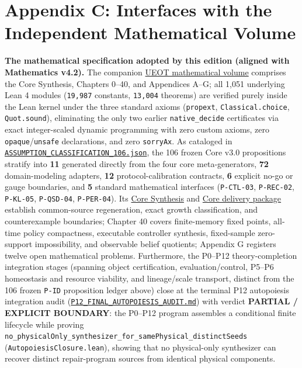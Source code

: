 \documentclass[
  english,
  11pt,
  oneside]{book}
\begin{document}
\chapter{Appendix C: Interfaces with the Independent Mathematical Volume}\label{ph-app-c}

\textbf{The mathematical specification adopted by this edition (aligned with Mathematics v4.2).} The companion \href{https://github.com/MurphyHoops/UEOT/blob/3d443ec29eb17af1fc00699a74e2d42d73516d81/mathematics/UEOT_MATHEMATICS.en.md}{UEOT mathematical volume} comprises the Core Synthesis, Chapters 0--40, and Appendices A--G; all 1,051 underlying Lean 4 modules (\texttt{19,987} constants, \texttt{13,004} theorems) are verified purely inside the Lean kernel under the three standard axioms (\texttt{propext}, \texttt{Classical.choice}, \texttt{Quot.sound}), eliminating the only two earlier \texttt{native\_decide} certificates via exact integer-scaled dynamic programming with zero custom axioms, zero \texttt{opaque}/\texttt{unsafe} declarations, and zero \texttt{sorryAx}. As cataloged in \href{https://github.com/MurphyHoops/UEOT/blob/3d443ec29eb17af1fc00699a74e2d42d73516d81/formalization/ueot-core/docs/ASSUMPTION_CLASSIFICATION_106.json}{\nolinkurl{ASSUMPTION_CLASSIFICATION_106.json}}, the 106 frozen Core v3.0 propositions stratify into \textbf{11} generated directly from the four core meta-generators, \textbf{72} domain-modeling adapters, \textbf{12} protocol-calibration contracts, \textbf{6} explicit no-go or gauge boundaries, and \textbf{5} standard mathematical interfaces (\texttt{P-CTL-03}, \texttt{P-REC-02}, \texttt{P-KL-05}, \texttt{P-QSD-04}, \texttt{P-PER-04}). Its \href{https://github.com/MurphyHoops/UEOT/blob/3d443ec29eb17af1fc00699a74e2d42d73516d81/mathematics/UEOT_MATHEMATICS.en.md\#core-theory}{Core Synthesis} and \href{https://github.com/MurphyHoops/UEOT/blob/3d443ec29eb17af1fc00699a74e2d42d73516d81/formalization/ueot-core/docs/compression/theory_completion/unified_closure/core_theory_closure_v1/README.md}{Core delivery package} establish common-source regeneration, exact growth classification, and counterexample boundaries; Chapter 40 covers finite-memory fixed points, all-time policy compactness, executable controller synthesis, fixed-sample zero-support impossibility, and observable belief quotients; Appendix G registers twelve open mathematical problems. Furthermore, the P0--P12 theory-completion integration stages (spanning object certification, evaluation/control, P5--P6 homeostasis and resource viability, and lineage/scale transport, distinct from the 106 frozen \texttt{P-ID} proposition ledger above) close at the terminal P12 autopoiesis integration audit (\href{https://github.com/MurphyHoops/UEOT/blob/3d443ec29eb17af1fc00699a74e2d42d73516d81/formalization/ueot-core/docs/compression/theory_completion/P12_FINAL_AUTOPOIESIS_AUDIT.md}{\nolinkurl{P12_FINAL_AUTOPOIESIS_AUDIT.md}}) with verdict \textbf{PARTIAL / EXPLICIT BOUNDARY}: the P0--P12 program assembles a conditional finite lifecycle while proving \nolinkurl{no_physicalOnly_synthesizer_for_samePhysical_distinctSeeds} (\texttt{AutopoiesisClosure.lean}), showing that no physical-only synthesizer can recover distinct repair-program sources from identical physical components. 
\end{document}
